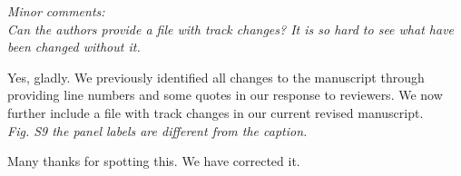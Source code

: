 \documentclass[11pt]{article}
\begin{document}
\emph{Minor comments:}\\
\emph{Can the authors provide a file with track changes? It is so hard to see what have been changed without it.}

Yes, gladly. We previously identified all changes to the manuscript through providing line numbers and some quotes in our response to reviewers. We now further include a file with track changes in our current revised manuscript.\\


\emph{Fig. S9 the panel labels are different from the caption.}

Many thanks for spotting this. We have corrected it.\\




\end{document}

